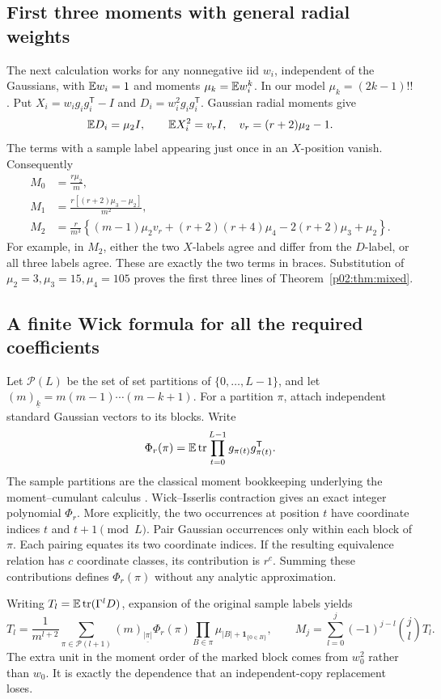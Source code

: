 \documentclass[11pt]{article}
\numberwithin{equation}{section}
\theoremstyle{definition}\newtheorem{definition}[theorem]{Definition}
\theoremstyle{remark}\newtheorem{remark}[theorem]{Remark}
\newcommand{\tr}{\operatorname{tr}}\newcommand{\Ent}{\operatorname{Ent}}
\newcommand{\fall}[2]{(#1)_{\underline{#2}}}
\begin{document}
\subsection{First three moments with general radial weights}
The next calculation works for any nonnegative iid \(w_i\), independent of the Gaussians, with \(\mathbb E w_i=1\) and moments \(\mu_k=\mathbb E w_i^k\). In our model \(\mu_k=(2k-1)!!\).
Put \(X_i=w_ig_ig_i^{\mathsf T}-I\) and \(D_i=w_i^2g_ig_i^{\mathsf T}\). Gaussian radial moments give
\[
 \mathbb E D_i=\mu_2 I,\qquad
 \mathbb E X_i^2=v_r I,\quad v_r=(r+2)\mu_2-1.
\]
The terms with a sample label appearing just once in an \(X\)-position vanish. Consequently
\begin{align}\label{p02:eq:firstthree}
 M_0&=\frac{r\mu_2}{m},\nonumber\\
 M_1&=\frac{r[(r+2)\mu_3-\mu_2]}{m^2},\\
 M_2&=\frac{r}{m^3}\left\{(m-1)\mu_2v_r
 +(r+2)(r+4)\mu_4-2(r+2)\mu_3+\mu_2\right\}.\nonumber
\end{align}
For example, in \(M_2\), either the two \(X\)-labels agree and differ from the \(D\)-label, or all three labels agree. These are exactly the two terms in braces. Substitution of \(\mu_2=3,\mu_3=15,\mu_4=105\) proves the first three lines of Theorem~\ref{p02:thm:mixed}.

\subsection{A finite Wick formula for all the required coefficients}
Let \(\mathcal P(L)\) be the set of set partitions of \(\{0,\ldots,L-1\}\), and let \(\fall m k=m(m-1)\cdots(m-k+1)\). For a partition \(\pi\), attach independent standard Gaussian vectors to its blocks. Write
\[
 \Phi_r(\pi)=\E\tr\prod_{t=0}^{L-1}g_{\pi(t)}g_{\pi(t)}^{\mathsf T}.
\]
The sample partitions are the classical moment bookkeeping underlying the
moment--cumulant calculus \cite[Chapter~2]{McCullagh}.
Wick--Isserlis contraction \cite{Isserlis} gives an exact integer polynomial \(\Phi_r\). More explicitly, the two occurrences at position \(t\) have coordinate indices \(t\) and \(t+1\pmod L\). Pair Gaussian occurrences only within each block of \(\pi\). Each pairing equates its two coordinate indices. If the resulting equivalence relation has \(c\) coordinate classes, its contribution is \(r^c\). Summing these contributions defines \(\Phi_r(\pi)\) without any analytic approximation.

Writing \(T_l=\E\tr(\Gamma^lD)\), expansion of the original sample labels yields
\begin{equation}\label{p02:eq:wick}
 T_l=\frac1{m^{l+2}}
 \sum_{\pi\in\mathcal P(l+1)}\fall m {\lvert\pi\rvert}
 \Phi_r(\pi)\prod_{B\in\pi}\mu_{\lvert B\rvert+\mathbf1_{\{0\in B\}}},
 \qquad
 M_j=\sum_{l=0}^j(-1)^{j-l}\binom jl T_l.
\end{equation}
The extra unit in the moment order of the marked block comes from \(w_0^2\) rather than \(w_0\). It is exactly the dependence that an independent-copy replacement loses.
\end{document}
